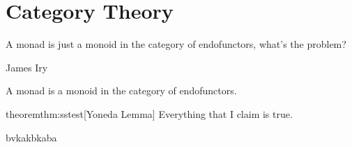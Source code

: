 \documentclass{scripts/preamble}
\begin{document}
    \chapter{Category Theory}\label{chap:cattheory}
    \epigraph{A monad is just a monoid in the category of endofunctors, what's the problem?}{James Iry}
    
    \noindent
    A monad is a monoid in the category of endofunctors.
    \begin{makethm}{theorem}{thm:sstest}[Yoneda Lemma]
        Everything that I claim is true.
    \end{makethm}
    bvkakbkaba
\end{document}
